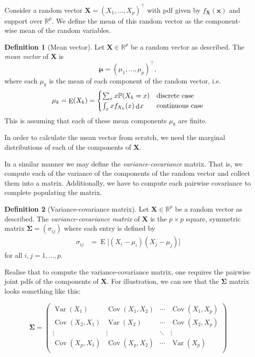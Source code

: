 \documentclass[
]{book}
\newcommand{\bx}{{\boldsymbol x}}
\newcommand{\bX}{{\boldsymbol X}}
\newcommand{\bmu}{{\boldsymbol\mu}}
\newcommand{\bSigma}{{\boldsymbol\Sigma}}
\DeclareMathOperator{\E}{E}
\DeclareMathOperator{\Var}{Var}
\DeclareMathOperator{\Cov}{Cov}
\newcommand{\bbR}{\mathbb{R}}
\newcommand{\bbP}{\mathbb{P}}
\DeclareMathOperator{\dd}{d}
\newcommand{\dint}{\dd\hspace{0.5pt}\!}
\theoremstyle{definition}
\newtheorem{definition}{Definition}[chapter]
\theoremstyle{definition}
\theoremstyle{definition}
\theoremstyle{definition}
\theoremstyle{remark}
\begin{document}
Consider a random vector \(\bX = (X_1,\dots,X_p)^\top\) with pdf given by \(f_{\bX}(\bx)\) and support over \(\bbR^p\).
We define the mean of this random vector as the component-wise mean of the random variables.

\begin{definition}[Mean vector]
Let \(\bX\in\bbR^p\) be a random vector as described. The \emph{mean vector} of \(\bX\) is
\[
\bmu = (\mu_1,\dots,\mu_p)^\top,
\]
where each \(\mu_k\) is the mean of each component of the random vector, i.e.
\[
\mu_k = \E(X_k) = \begin{cases}
\sum_x x\bbP(X_k=x) & \text{discrete case} \\
\int_x xf_{X_k}(x) \dint x & \text{continuous case} \\
\end{cases}
\]
This is assuming that each of these mean components \(\mu_k\) are finite.
\end{definition}

In order to calculate the mean vector from scratch, we need the marginal distributions of each of the components of \(\bX\).

In a similar manner we may define the \emph{variance-covariance} matrix.
That is, we compute each of the variance of the components of the random vector and collect them into a matrix.
Additionally, we have to compute each pairwise covariance to complete populating the matrix.

\begin{definition}[Variance-covariance matrix]
Let \(\bX\in\bbR^p\) be a random vector as described. The \emph{variance-covariance matrix} of \(\bX\) is the \(p \times p\) square, symmetric matrix \(\bSigma=(\sigma_{ij})\) where each entry is defined by
\begin{align*}
\sigma_{ij} 
&= \E\big[(X_i-\mu_i)(X_j-\mu_j) \big] 
\end{align*}
for all \(i,j=1,\dots,p\).
\end{definition}

Realise that to compute the variance-covariance matrix, one requires the pairwise joint pdfs of the components of \(\bX\).
For illustration, we can see that the \(\bSigma\) matrix looks something like this:

\[
\bSigma = \begin{pmatrix}
\Var(X_1)   &\Cov(X_1,X_2) &\cdots &\Cov(X_1,X_p) \\
\Cov(X_2,X_1)   &\Var(X_2) &\cdots &\Cov(X_2,X_p) \\
\vdots &\vdots &\ddots&\vdots \\
\Cov(X_p,X_1)   &\Cov(X_p,X_2) &\cdots &\Var(X_p) \\
\end{pmatrix}
\]
\end{document}
